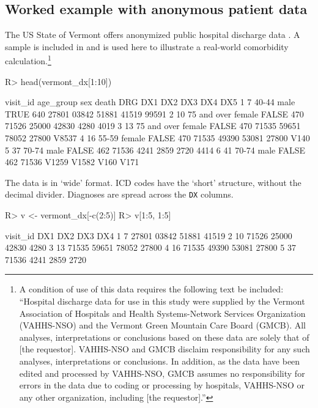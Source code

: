 \documentclass[article]{jss}
\begin{document}
\hypertarget{worked-example-with-anonymous-patient-data}{%
\subsection{Worked example with anonymous patient
data}\label{worked-example-with-anonymous-patient-data}}

The US State of Vermont offers anonymized public hospital discharge data
\citep{VermontDepartmentofHealth_VermontHospitalDischarge_2016}. A
sample is included in  and is used here to illustrate a
real-world comorbidity calculation.\footnote{A condition of use of this
  data requires the following text be included: ``Hospital discharge
  data for use in this study were supplied by the Vermont Association of
  Hospitals and Health Systems-Network Services Organization (VAHHS-NSO)
  and the Vermont Green Mountain Care Board (GMCB). All analyses,
  interpretations or conclusions based on these data are solely that of
  {[}the requestor{]}. VAHHS-NSO and GMCB disclaim responsibility for
  any such analyses, interpretations or conclusions. In addition, as the
  data have been edited and processed by VAHHS-NSO, GMCB assumes no
  responsibility for errors in the data due to coding or processing by
  hospitals, VAHHS-NSO or any other organization, including {[}the
  requestor{]}.''}

\begin{CodeChunk}

\begin{CodeInput}
R> head(vermont_dx[1:10])
\end{CodeInput}

\begin{CodeOutput}
  visit_id   age_group    sex death DRG   DX1   DX2   DX3   DX4   DX5
1        7       40-44   male  TRUE 640 27801 03842 51881 41519 99591
2       10 75 and over female FALSE 470 71526 25000 42830  4280  4019
3       13 75 and over female FALSE 470 71535 59651 78052 27800 V8537
4       16       55-59 female FALSE 470 71535 49390 53081 27800  V140
5       37       70-74   male FALSE 462 71536  4241  2859  2720  4414
6       41       70-74   male FALSE 462 71536 V1259 V1582  V160  V171
\end{CodeOutput}
\end{CodeChunk}

The data is in `wide' format. ICD codes have the `short' structure,
without the decimal divider. Diagnoses are spread across the \texttt{DX}
columns.

\begin{CodeChunk}

\begin{CodeInput}
R> v <- vermont_dx[-c(2:5)]
R> v[1:5, 1:5]
\end{CodeInput}

\begin{CodeOutput}
  visit_id   DX1   DX2   DX3   DX4
1        7 27801 03842 51881 41519
2       10 71526 25000 42830  4280
3       13 71535 59651 78052 27800
4       16 71535 49390 53081 27800
5       37 71536  4241  2859  2720
\end{CodeOutput}
\end{CodeChunk}
\end{document}
